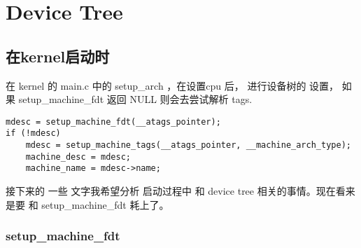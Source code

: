 \chapter{Device Tree}

\section{在kernel启动时}

在 kernel 的 main.c 中的 setup\_arch ，在设置cpu 后， 
进行设备树的 设置， 如果 setup\_machine\_fdt 返回 NULL 
则会去尝试解析  tags.
\begin{lstlisting}
mdesc = setup_machine_fdt(__atags_pointer);
if (!mdesc)
	mdesc = setup_machine_tags(__atags_pointer, __machine_arch_type);
    machine_desc = mdesc;
	machine_name = mdesc->name;
\end{lstlisting}




接下来的 一些 文字我希望分析 启动过程中 和 device tree 相关的事情。现在看来 是要 和 setup\_machine\_fdt
耗上了。


\subsection{setup\_machine\_fdt}

